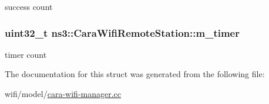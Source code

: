 success count 

\subsubsection[{\texorpdfstring{m\+\_\+timer}{m_timer}}]{\setlength{\rightskip}{0pt plus 5cm}uint32\+\_\+t ns3\+::\+Cara\+Wifi\+Remote\+Station\+::m\+\_\+timer}\hypertarget{structns3_1_1CaraWifiRemoteStation_ab50d2a89c86c4efbefa117a4958114e6}{}\label{structns3_1_1CaraWifiRemoteStation_ab50d2a89c86c4efbefa117a4958114e6}


timer count 



The documentation for this struct was generated from the following file\+:\begin{DoxyCompactItemize}
\item 
wifi/model/\hyperlink{cara-wifi-manager_8cc}{cara-\/wifi-\/manager.\+cc}\end{DoxyCompactItemize}

